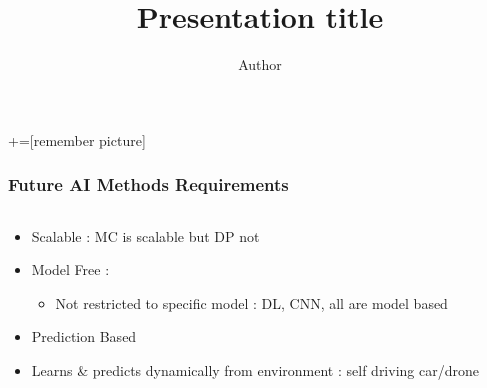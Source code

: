 \documentclass{beamer} %
\author{Author}
\title{Presentation title}
\begin{document}

+=[remember picture]

\everymath{\displaystyle}
\begin{frame}
\frametitle{Future AI Methods Requirements}


\begin{columns}
    \begin{column}{1\textwidth}
     \begin{block}{}
			\begin{itemize}
				\item Scalable : MC is scalable but DP not
				\item Model Free : 		
					\begin{itemize}
						\item Not restricted to specific model : DL, CNN, all are model based
						
					\end{itemize}
				\item Prediction Based
				\item Learns \& predicts dynamically from environment : self driving car/drone
			\end{itemize}

    \end{block}
    \end{column}
    \begin{column}{.5\textwidth}
    \begin{block}{}
    \end{block}
    \end{column}
  \end{columns}

\end{frame}
\end{document}
